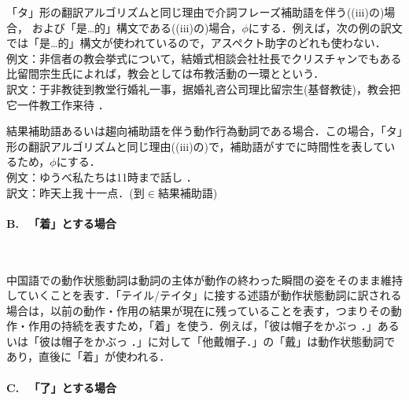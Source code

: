 \begin{enumerater}
\item 「タ」形の翻訳アルゴリズムと同じ理由で介詞フレーズ補助語を伴う((iii)の)場合， および「是…的」構文である((iii)の)場合，$\phi$にする．例えば，次の例の訳文では「是…的」構文が使われているので，アスペクト助字のどれも使わない．\\例文：非信者の教会挙式について，結婚式相談会社社長でクリスチャンでもある比留間宗生氏によれば，教会としては布教活動の一環とという．\\訳文：于非教徒到教堂行婚礼一事，据婚礼咨公司理比留宗生(基督教徒)，教会把它一件教工作来待 ．
\item 結果補助語あるいは趨向補助語を伴う動作行為動詞である場合．この場合，「タ」形の翻訳アルゴリズムと同じ理由((iii)の)で，補助語がすでに時間性を表しているため，$\phi$にする．\\例文：ゆうべ私たちは11時まで話し ．\\訳文：昨天上我\,十一点．(到$\in$結果補助語)
\end{enumerater}

\paragraph{B. 　「着」とする場合}　

中国語での動作状態動詞は動詞の主体が動作の終わった瞬間の姿をそのまま維持していくことを表す．「テイル/テイタ」に接する述語が動作状態動詞に訳される場合は，以前の動作・作用の結果が現在に残っていることを表す，つまりその動作・作用の持続を表すため，「着」を使う．例えば，「彼は帽子をかぶっ ．」あるいは「彼は帽子をかぶっ ．」に対して「他戴帽子．」の「戴」は動作状態動詞であり，直後に「着」が使われる．

\paragraph{C. 　「了」とする場合}　


